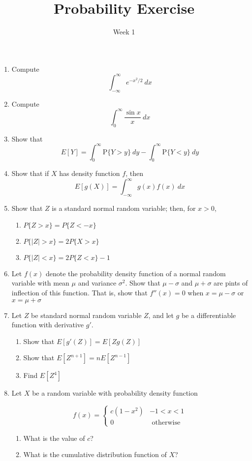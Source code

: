 


\title{Probability Exercise}

\author{Week 1}

\maketitle

\begin{enumerate}
\item Compute $$ \int_{-\infty}^{\infty} e^{-x^2/2}\ dx $$
\item Compute $$ \int_{0}^{\infty} \frac{\sin x}{x}\ dx $$
\item Show that $$E[Y] = \int_{0}^{\infty} \mathrm{P}\{Y > y\}\ dy - \int_{0}^{\infty} \mathrm{P}\{Y < y\}\ dy$$ 
\item Show that if $X$ has density function $f$, then $$ E[g(X)] =\int_{-\infty}^{\infty} g(x)f(x)\ dx  $$
\item Show that $Z$ is a standard normal random variable; then, for $x > 0$,
	\begin{enumerate}
	\item $P\{Z > x\} = P\{Z < -x\}$
	\item $P\{|Z| > x\} = 2P\{X > x\}$
	\item $P\{|Z| < x\} = 2P\{Z < x\} - 1$
	\end{enumerate}
\item Let $f(x)$ denote the probability density function of a normal random variable with mean $\mu$ and variance $\sigma^2$. Show that $\mu - \sigma$ and $\mu + \sigma$ are pints of inflection of this function. That is, show that $f''(x) = 0$ when $x = \mu - \sigma$ or $x = \mu + \sigma$
\item Let $Z$ be standard normal random variable $Z$, and let $g$ be a differentiable function with derivative $g'$.
	\begin{enumerate}
	\item Show that $E[g'(Z)] = E[Zg(Z)]$
	\item Show that $E[Z^{n+1}] = nE[Z^{n-1}]$
	\item Find $E[Z^4]$
	\end{enumerate}
	
\newpage
	
\item Let $X$ be a random variable with probability density function

$$f(x) = \begin{cases}
	c(1 - x^2) & -1 < x < 1\\
	0 & \text{ otherwise}
\end{cases}$$
	\begin{enumerate}
	\item What is the value of $c$?
	\item What is the cumulative distribution function of $X$?
	\end{enumerate}


\end{enumerate}
